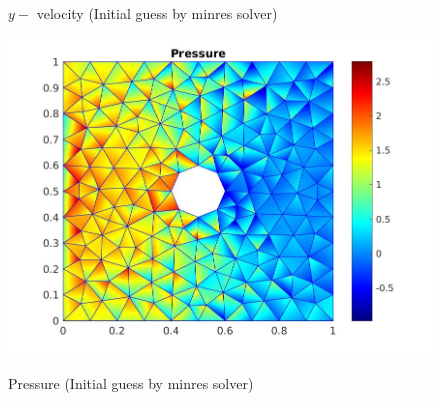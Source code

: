 \documentclass[a4paper]{book}
\begin{document}
\begin{figure}
\begin{minipage}[c]{0.3\textwidth}
    \caption{$y-$ velocity (Initial guess by minres solver)}
  \label{y_vel_navier_stoke_minres}
  \end{minipage}
  \begin{minipage}[c]{0.67\textwidth}
    \includegraphics[width=\textwidth]{cylinder_newton_pressure_minres.jpg}
  \end{minipage}\hfill
  \begin{minipage}[c]{0.3\textwidth}
    \caption{Pressure (Initial guess by minres solver)}
  \label{pressure_navier_stoke_minres}
  \end{minipage}
\caption{\label{flow_over_cylinder_minres_n_s}}
\end{figure}
\end{document}
